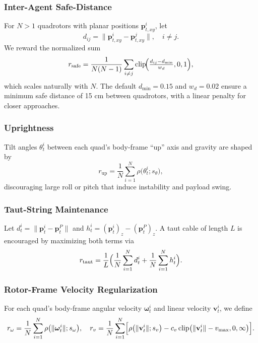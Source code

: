 \subsubsection{Inter-Agent Safe-Distance}
For \(N>1\) quadrotors with planar positions \(\mathbf{p}^i_{t,xy}\), let
\begin{equation}
d_{ij} = \lVert\mathbf{p}^i_{t,xy}-\mathbf{p}^j_{t,xy}\rVert,\quad i\neq j.
\end{equation}
We reward the normalized sum
\begin{equation}
r_{\mathrm{safe}}
= \frac{1}{N(N-1)}\sum_{i\neq j}\mathrm{clip}\!\Bigl(\tfrac{d_{ij}-d_{\min}}{w_d},0,1\Bigr),
\end{equation}
which scales naturally with \(N\). The default \(d_{\min}=0.15\) and \(w_d=0.02\) ensure a minimum safe distance of 15 cm between quadrotors, with a linear penalty for closer approaches.

\subsubsection{Uprightness}
Tilt angles \(\theta^i_t\) between each quad's body-frame “up” axis and gravity are shaped by
\begin{equation}
r_{\mathrm{up}}
= \frac{1}{N}\sum_{i=1}^N \rho\bigl(\theta^i_t; s_\theta\bigr),
\end{equation}
discouraging large roll or pitch that induce instability and payload swing.

\subsubsection{Taut-String Maintenance}
Let \(d^i_t=\lVert\mathbf{p}^i_t-\mathbf{p}^P_t\rVert\) and \(h^i_t=(\mathbf{p}^i_t)_z-(\mathbf{p}^P_t)_z\).  A taut cable of length \(L\) is encouraged by maximizing both terms via
\begin{equation}
r_{\mathrm{taut}}
= \frac{1}{L}\Bigl(\frac{1}{N}\sum_{i=1}^N d^i_t + \frac{1}{N}\sum_{i=1}^N h^i_t\Bigr).
\end{equation}

\subsubsection{Rotor-Frame Velocity Regularization}
For each quad's body-frame angular velocity \(\boldsymbol{\omega}^i_t\) and linear velocity \(\mathbf{v}^i_t\), we define
\begin{equation}
r_{\omega}
= \frac{1}{N}\sum_{i=1}^N \rho\bigl(\lVert\boldsymbol{\omega}^i_t\rVert; s_\omega\bigr),
\quad
r_{v}
= \frac{1}{N}\sum_{i=1}^N \Bigl[\rho\bigl(\lVert\mathbf{v}^i_t\rVert; s_v\bigr)
- c_v\,\mathrm{clip}\bigl(\lVert\mathbf{v}^i_t\rVert - v_{\max},0,\infty\bigr)\Bigr].
\end{equation}

